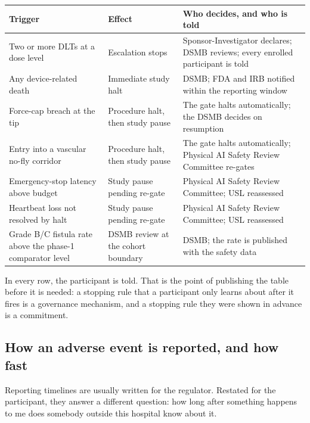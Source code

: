 \vspace{0.30em}

\noindent\begin{tabularx}{\textwidth}{L{4.6cm} L{2.6cm} Y}
\toprule
\textbf{Trigger} & \textbf{Effect} & \textbf{Who decides, and who is told} \\
\midrule
Two or more DLTs at a dose level & Escalation stops & Sponsor-Investigator declares; DSMB reviews; every enrolled participant is told \\
Any device-related death & Immediate study halt & DSMB; FDA and IRB notified within the reporting window \\
Force-cap breach at the tip & Procedure halt, then study pause & The gate halts automatically; the DSMB decides on resumption \\
Entry into a vascular no-fly corridor & Procedure halt, then study pause & The gate halts automatically; Physical AI Safety Review Committee re-gates \\
Emergency-stop latency above budget & Study pause pending re-gate & Physical AI Safety Review Committee; USL reassessed \\
Heartbeat loss not resolved by halt & Study pause pending re-gate & Physical AI Safety Review Committee; USL reassessed \\
Grade B/C fistula rate above the phase-1 comparator level & DSMB review at the cohort boundary & DSMB; the rate is published with the safety data \\
\bottomrule
\end{tabularx}

\vspace{0.30em}

\noindent In every row, the participant is told. That is the point of publishing
the table before it is needed: a stopping rule that a participant only learns
about after it fires is a governance mechanism, and a stopping rule they were
shown in advance is a commitment.

\subsection{How an adverse event is reported, and how fast}

Reporting timelines are usually written for the regulator. Restated for the
participant, they answer a different question: how long after something happens
to me does somebody outside this hospital know about it.

\vspace{0.30em}

